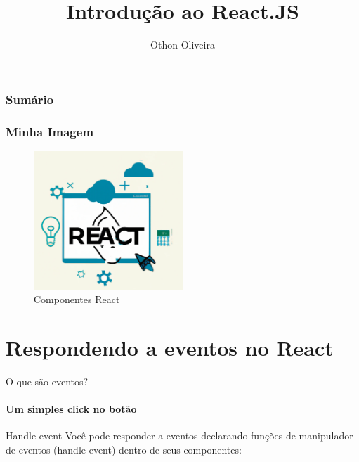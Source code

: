 \documentclass[13pt, xcolor={dvipsnames,svgnames}, portuguese]{beamer}
\author{Othon Oliveira}
\title{Introdução ao React.JS}
\institute{SENAC - PROA}
\date{}
\begin{document}

\begin{frame}
\titlepage
\end{frame}

\newcommand{\capa}{
    \begin{tikzpicture}[remember picture,overlay]
        \node at (current page.south west)
            {\begin{tikzpicture}[remember picture, overlay]
                \fill[shading=radial,top color=orange,bottom color=orange,middle color=yellow] (0,0) rectangle (\paperwidth,\paperheight);
            \end{tikzpicture}
          };
    \end{tikzpicture}
}

\begin{frame}\frametitle{Sumário}
\tableofcontents
\end{frame}


\begin{frame}
\frametitle{Minha Imagem}
\begin{figure}
\centering
\includegraphics[width=0.5\textwidth]{Figuras/react1.png}
\caption{Componentes React}
\end{figure}
\end{frame}

\section{Respondendo a eventos no React}
\begin{frame}{O que são eventos?}
\framesubtitle{Um simples click no botão}
	\begin{block}{Handle event}
       Você pode responder a eventos declarando funções de manipulador de eventos (handle event) dentro de seus componentes:
	\end{block}	
	
\end{frame}
\end{document}
